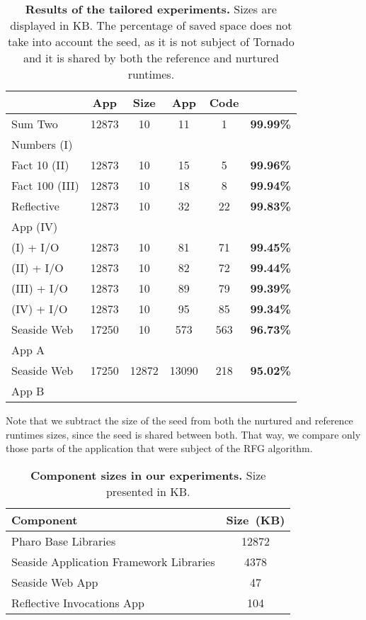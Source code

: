 \begin{description}
\begin{table}[ht]
\begin{tabular}{lccccc}
 			& \textbf{App}
			& \textbf{Size}
			& \textbf{App}
			& \textbf{Code}
			& \textbf{}\\
		\toprule
		Sum Two
 			&  12873 & 10 & 11 & 1 & \textbf{99.99\%}\\
		Numbers (I)
 			& &&&&\\
		\midrule
		Fact 10 (II)
 			& 12873 & 10 & 15 & 5 & \textbf{99.96\%}\\
		\midrule
		Fact 100 (III)
 			& 12873 & 10 & 18 & 8 & \textbf{99.94\%}\\
		\midrule
		Reflective
 			& 12873 & 10 & 32 & 22 & \textbf{99.83\%}\\
		App (IV)&&&&&\\
		\midrule
		(I) + I/O
 			& 12873 & 10 & 81 & 71 & \textbf{99.45\%}\\
		\midrule
		(II) + I/O
 			& 12873 & 10 & 82 & 72 & \textbf{99.44\%}\\
		\midrule
		(III) + I/O
 			& 12873 & 10 & 89 & 79 & \textbf{99.39\%}\\
		\midrule
		(IV) + I/O
 			& 12873 & 10 & 95 & 85 & \textbf{99.34\%}\\
		\midrule
		Seaside Web
 			& 17250 & 10 & 573 & 563 & \textbf{96.73\%}\\
		App A&&&&&\\
		\midrule
		Seaside Web
 			& 17250 & 12872 & 13090 & 218 & \textbf{95.02\%}\\
		App B&&&&&\\
		\bottomrule
 	\end{tabular}
 	\caption{\textbf{Results of the tailored experiments.} Sizes are displayed in KB. The percentage of saved space does not take into account the seed, as it is not subject of Tornado and it is shared by both the reference and nurtured runtimes.}
 	\label{tb:results}
 \end{table}


Note that we subtract the size of the seed from both the nurtured and reference runtimes sizes, since the seed is shared between both. That way, we compare only those parts of the application that were subject of the RFG algorithm.

\end{description}

 \begin{table}[ht]
 	\centering
 	\begin{tabular}{lc}
			\toprule
			\textbf{Component}
 			& \textbf{Size~(KB)}\\
		\toprule
		Pharo Base Libraries & 12872\\\midrule
		Seaside Application Framework Libraries & 4378\\\midrule
		Seaside Web App & 47\\\midrule
		Reflective Invocations App & 104\\\bottomrule
 	\end{tabular}
 	\caption{\textbf{Component sizes in our experiments.} Size presented in KB.\label{tb:tailored_components}}
 	\label{tb:basic_sizes}
 \end{table}

